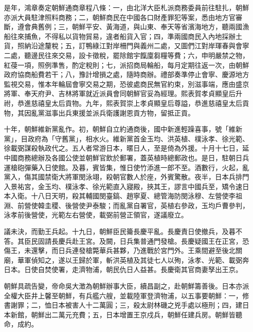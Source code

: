 \begin{pinyinscope}
是年，鴻章奏定朝鮮通商章程八條：一，由北洋大臣札派商務委員前往駐扎，朝鮮亦派大員駐津照料商務；二，朝鮮商民在中國各口財產罪犯等案，悉由地方官審斷，遵會典舊例；三，朝鮮平安、黃海道，與山東、奉天等省濱海地方，聽兩國漁船往來捕魚，不得私以貨物貿易，違者船貨入官；四，準兩國商民入內地採辦土貨，照納沿途釐稅；五，訂鴨綠江對岸柵門與義州二處，又圖們江對岸琿春與會寧二處，聽邊民往來交易，設卡徵稅，罷除館宇餼廩芻糧等費；六，申明嚴禁之物，紅葠一項，照例準售，酌定稅則；七，派招商局輪船，每月定期往返一次，由朝鮮政府協商船費若干；八，豫計增損之處，隨時商辦。禮部奏準停止會寧、慶源地方監視交易，惟本年輪屆會寧交易之期，恐彼處商民無官約束，別滋事端，應由盛京將軍、奉天府尹、吉林將軍就近派員會同朝鮮官妥為經理。熙表賀孝貞顯皇后升祔，恭進慈禧皇太后貢物。九年，熙表賀崇上孝貞顯皇后尊謚，恭進慈禧皇太后貢物，其因亂黨滋事出兵東援並派兵衛護謝恩貢方物，留抵正貢。

十年，朝鮮維新黨亂作。初，朝鮮自立約通商後，國中新進輕躁喜事，號「維新黨」，目政府為「守舊黨」，相水火。維新黨首金玉均、洪英植、樸泳孝、徐光範、徐載弼謀殺執政代之。五人者常游日本，暱日人，至是倚為外援。十月十七日，延中國商務總辦及各國公使並朝鮮官飲於郵署，蓋英植時總郵政也。是日，駐朝日兵運槍砲彈藥入日使館。及暮，賓皆集，惟日使竹添進一郎不至。酒數行，火起，亂黨入，傷其國禁衛大將軍閔泳翊，殺朝官數人於座，外賓驚散。夜半，日本兵排門入景祐宮，金玉均、樸泳孝、徐光範直入寢殿，挾其王，謬言中國兵至，矯令速日本入衛。十八日天明，殺其輔國閔臺鎬、趙寧夏、總管海防閔泳穆、左營使李祖淵、前營使韓圭稷、後營使尹泰駿；而亂黨自署官，英植右參政，玉均戶曹參判，泳孝前後營使，光範左右營使，載弼前營正領官，遂議廢立。

議未決，而勤王兵起。十九日，朝鮮臣民籥長慶平亂。長慶責日使撤兵，及暮不答。其臣民固請長慶兵赴王宮。及闕，日兵集普通門發槍。長慶疑國王在正宮，恐傷王，未還擊，而日兵連發槍斃華兵甚夥，乃進戰於宮門外。王乘間避至後北關廟，華軍偵知之，遂以王歸於軍，斬洪英植及其徒七人以殉，泳孝、光範、載弼奔日本。日使自焚使署，走濟物浦，朝民仇日人益甚。長慶衛其官商妻孥出王京。

朝鮮具疏告變，帝命吳大澂為朝鮮辦事大臣，續昌副之，赴朝鮮籌善後。日本亦派全權大臣井上馨至朝鮮，有兵艦六艘，並載陸軍登濟物浦，以五事要朝鮮：一，修書謝罪；二，恤日本被害人十二萬圓；三，殺太尉林磯之兇手處以極刑；四，建日本新館，朝鮮出二萬元充費；五，日本增置王京戍兵，朝鮮任建兵房。朝鮮皆聽命，成約。


\end{pinyinscope}
